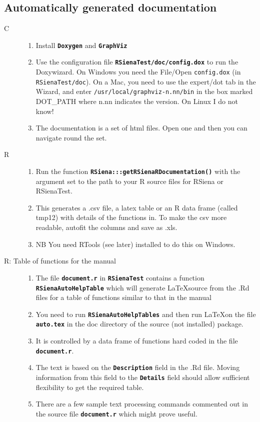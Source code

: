 \documentclass[12pt, a4paper]{article}
\renewcommand{\=}{\,=\,}
\newcommand{\+}{\,+\,}
\newcommand{\sfn}[1]{\textbf{\texttt{#1}}}
\begin{document}
\subsection{Automatically generated documentation}
\begin{description}
\item[C]
\begin{enumerate}
\item Install \sfn{Doxygen} and \sfn{GraphViz}
\item Use the configuration file \sfn{RSienaTest/doc/config.dox} to run the
  Doxywizard. On Windows you need the File/Open \texttt{config.dox} (in
  \texttt{RSienaTest/doc}).  On a Mac, you need to use the expert/dot tab in the
  Wizard, and enter \texttt{/usr/local/graphviz-n.nn/bin} in the box marked
  DOT\_PATH where n.nn indicates the version. On
  Linux I do not know!
\item The documentation is a set of html files. Open one and then you can
  navigate round the set.
\end{enumerate}
\item[R]
\begin{enumerate}
\item Run the function \sfn{RSiena:::getRSienaRDocumentation()} with the
  argument set to the path to your R source files for RSiena or RSienaTest.
\item This generates a .csv file, a latex table or an R data frame (called
  tmp12) with details of the functions in. To make the csv more readable,
  autofit the columns and save as .xls.
\item NB You need RTools (see later) installed to do this on Windows.
\end{enumerate}
\item[R: Table of functions for the manual]
\begin{enumerate}
\item The file \sfn{document.r} in \sfn{RSienaTest} contains a function
  \sfn{RSienaAutoHelpTable} which will generate \LaTeX source  from the .Rd
  files for a table of functions similar to that in the manual
\item You need to run \sfn{RSienaAutoHelpTables} and then run \LaTeX on the file
  \sfn{auto.tex} in the doc directory of the source (not installed) package.
\item It is controlled by a data frame of functions hard coded in the file
  \sfn{document.r}.
\item The text is based on the \sfn{Description} field in the .Rd file. Moving
  information from this field to the \sfn{Details} field should allow sufficient
  flexibility to get the required table.
\item There are a few sample text processing commands commented out in the
  source file \sfn{document.r} which might prove useful.
\end{enumerate}
\end{description}
\end{document}
